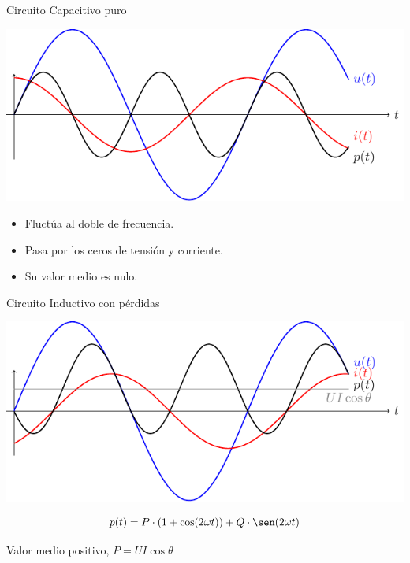 \documentclass[aspectratio=169, usenames,svgnames,dvipsnames]{beamer}
\begin{document}
\begin{frame}[label={sec:org27e92de}]{Circuito Capacitivo puro}
\begin{center}
\includegraphics[width=.9\linewidth]{../figs/capacitivoPuroPotencia.pdf}
\end{center}

\begin{itemize}
\item Fluctúa al doble de frecuencia.
\item Pasa por los ceros de tensión y corriente.
\item Su valor medio es nulo.
\end{itemize}
\end{frame}

\begin{frame}[label={sec:org495c9ae}]{Circuito Inductivo con pérdidas}
\begin{center}
\includegraphics[height=0.5\textheight]{../figs/inductivoPotencia.pdf}
\end{center}

\[
     p(t) = P \cdot (1 + \cos(2\omega t)) + Q \cdot \sen(2\omega t)
\]

\begin{center}
Valor medio positivo, \(P = U I \cos \theta\)
\end{center}
\end{frame}
\end{document}
